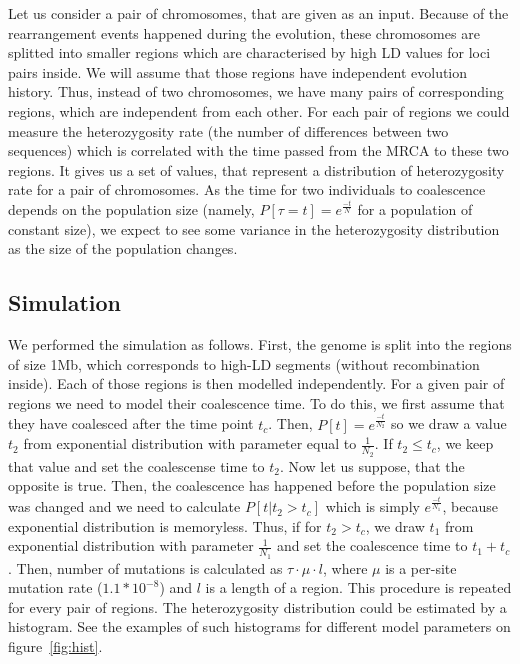 \documentclass[a4paper]{article}
\begin{document}
Let us consider a pair of chromosomes, that are given as an input. Because of the 
rearrangement events happened during the evolution, these chromosomes are splitted
into smaller regions which are characterised by high LD values for loci pairs inside.
We will assume that those regions have independent evolution history. Thus,
instead of two chromosomes, we have many pairs of corresponding regions, which are
independent from each other. For each pair of regions we could measure the heterozygosity
rate (the number of differences between two sequences) which is correlated with the time
passed from the MRCA to these two regions. It gives us a set of values, that
represent a distribution of heterozygosity rate for a pair of chromosomes. As the time 
for two individuals to coalescence depends on the population size (namely, 
$P[\tau=t] = e^{\frac{-t}{N}}$ for a population of constant size), we expect to see
some variance in the heterozygosity distribution as the size of the population changes.

\subsection{Simulation}

We performed the simulation as follows. First, the genome is split into the regions of
size 1Mb, which corresponds to high-LD segments (without recombination inside). Each of
those regions is then modelled independently. For a given pair of regions we need to
model their coalescence time. To do this, we first assume that they have coalesced
after the time point $t_c$. Then, $P[t] = e^{\frac{-t}{N_2}}$ so we draw a 
value $t_2$ from exponential distribution with parameter equal to $\frac{1}{N_2}$. 
If $t_2 \leq t_c$, we keep that value and set the coalescense time to $t_2$. 
Now let us suppose, that the opposite is true.
Then, the coalescence has happened before the population size was changed and we
need to calculate $P[t | t_2 > t_c]$ which is simply $e^{\frac{-t}{N_1}}$, because
exponential distribution is memoryless. Thus, if for $t_2 > t_c$, we draw $t_1$
from exponential distribution with parameter $\frac{1}{N_1}$ and set the coalescence time
to $t_1 + t_c$. Then, number of mutations is calculated as $\tau \cdot \mu \cdot l$, 
where $\mu$ is
a per-site mutation rate ($1.1 * 10^{-8}$) and $l$ is a length of a region. This
procedure is repeated for every pair of regions. The heterozygosity
distribution could be estimated by a histogram. See the examples of such histograms for
different model parameters on figure~\ref{fig:hist}.
\end{document}
